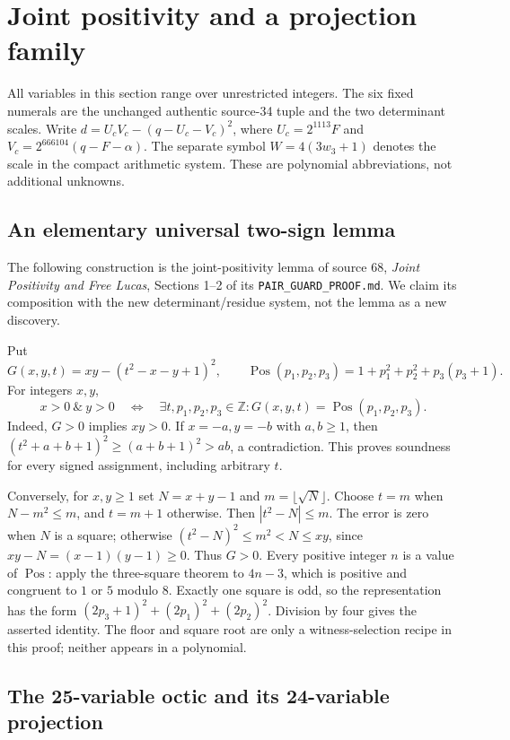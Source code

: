 \section{Joint positivity and a projection family}
\label{sec:joint-projections}

All variables in this section range over unrestricted integers.  The six fixed
numerals are the unchanged authentic source-34 tuple and the two determinant
scales.  Write $d=U_cV_c-(q-U_c-V_c)^2$, where
$U_c=2^{1113}F$ and $V_c=2^{666104}(q-F-\alpha)$.
The separate symbol $W=4(3w_3+1)$ denotes the scale in the compact
arithmetic system.  These are polynomial abbreviations, not additional unknowns.

\subsection{An elementary universal two-sign lemma}

The following construction is the joint-positivity lemma of source 68,
\emph{Joint Positivity and Free Lucas}, Sections 1--2 of its
\texttt{PAIR\_GUARD\_PROOF.md}.  We claim its composition with the new
determinant/residue system, not the lemma as a new discovery.

Put
\[
 G(x,y,t)=xy-(t^2-x-y+1)^2,
 \qquad \operatorname{Pos}(p_1,p_2,p_3)
 =1+p_1^2+p_2^2+p_3(p_3+1).
\]
For integers $x,y$,
\[
 x>0\ \&\ y>0
 \quad\Longleftrightarrow\quad
 \exists t,p_1,p_2,p_3\in\mathbb Z:
 G(x,y,t)=\operatorname{Pos}(p_1,p_2,p_3).       \tag{JP}
\]
Indeed, $G>0$ implies $xy>0$.  If $x=-a,y=-b$ with $a,b\geq1$,
then $(t^2+a+b+1)^2\geq(a+b+1)^2>ab$, a contradiction.  This proves
soundness for every signed assignment, including arbitrary $t$.

Conversely, for $x,y\geq1$ set $N=x+y-1$ and $m=\lfloor\sqrt N\rfloor$.
Choose $t=m$ when $N-m^2\leq m$, and $t=m+1$ otherwise.  Then
$|t^2-N|\leq m$.  The error is zero when $N$ is a square; otherwise
$(t^2-N)^2\leq m^2<N\leq xy$, since $xy-N=(x-1)(y-1)\geq0$.
Thus $G>0$.  Every positive integer $n$ is a value of
$\operatorname{Pos}$: apply the three-square theorem to $4n-3$, which is
positive and congruent to $1$ or $5$ modulo $8$.  Exactly one square is odd,
so the representation has the form
$(2p_3+1)^2+(2p_1)^2+(2p_2)^2$.  Division by four gives the asserted
identity.  The floor and square root are only a witness-selection recipe
in this proof; neither appears in a polynomial.

\subsection{The 25-variable octic and its 24-variable projection}

